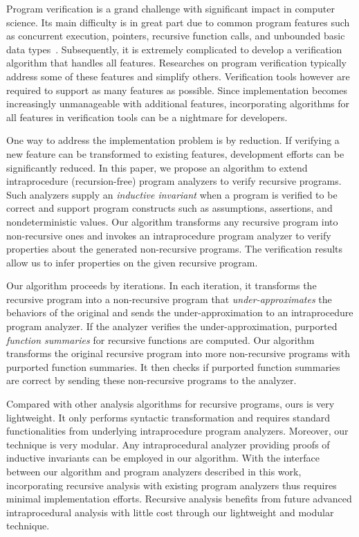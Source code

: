 Program verification is a grand challenge with significant impact in computer science.
Its main difficulty is in great part due to common program features such as concurrent execution,  pointers,  recursive function calls,  and unbounded basic data types~\cite{ClarkeJS05}. Subsequently, it is extremely complicated to develop a verification algorithm that handles all features. Researches on program verification typically address some of these features and simplify others. Verification tools however are required to support as many features as possible. Since implementation becomes increasingly unmanageable with additional features, incorporating algorithms for all features in verification tools can be a nightmare for developers.

One way to address the implementation problem is by reduction. If verifying a new feature can be transformed to existing features, development efforts can be significantly reduced.
In this paper, we propose an algorithm to extend intraprocedure (recursion-free) program analyzers to verify recursive programs. Such analyzers supply an \emph{inductive invariant} when a program is verified to be correct and support program constructs such as assumptions, assertions, and nondeterministic values. Our algorithm transforms any recursive program into non-recursive ones and invokes an intraprocedure program analyzer to verify properties about the generated non-recursive programs. The verification results allow us to infer properties on the given recursive program.

Our algorithm proceeds by iterations. In each iteration, it transforms the recursive program into a non-recursive program that \emph{under-approximates} the behaviors of the original and sends the under-approximation to an intraprocedure program analyzer. If the analyzer verifies the under-approximation, purported \emph{function summaries} for recursive functions are computed. Our algorithm transforms the original recursive program into more non-recursive programs with purported function summaries. It then checks if purported function summaries are correct by sending these non-recursive programs to the analyzer.

Compared with other analysis algorithms for recursive programs, ours is very lightweight. It only performs syntactic transformation and requires standard functionalities from underlying intraprocedure program analyzers. Moreover, our technique is very modular. Any intraprocedural analyzer providing proofs of inductive invariants can be employed in our algorithm. With the interface between our algorithm and program analyzers described in this work, incorporating recursive analysis with existing program analyzers thus requires minimal implementation efforts. Recursive analysis benefits from future advanced intraprocedural analysis with little cost through our lightweight and modular technique. 

